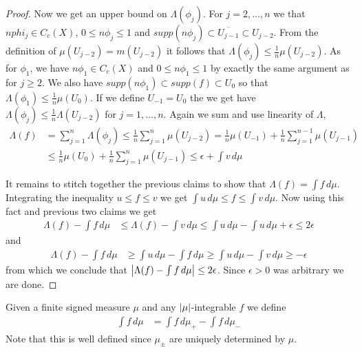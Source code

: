 \begin{proof}
Now we get an upper bound on $\Lambda(\phi_j)$.   For $j=2, \dotsc, n$ we that
$n phi_j \in C_c(X)$, $0 \leq n \phi_j \leq 1$ and $supp(n \phi_j)
\subset \overline{U_{j-1}} \subset U_{j-2}$.  From the definition of
$\mu(U_{j-2}) =m(U_{j-2})$ it follows that $\Lambda(\phi_j) \leq
\frac{1}{n} \mu(U_{j-2})$.  As for $\phi_1$, we have
$n \phi_1 \in C_c(X)$ and $0 \leq n\phi_1 \leq 1$ by exactly the same
argument as for $j \geq 2$.  We also have $supp(n \phi_1) \subset
supp(f) \subset U_0$ so that $\Lambda(\phi_1) \leq \frac{1}{n}
\mu(U_0)$.  If we define $U_{-1} = U_0$ the we get
have $\Lambda(\phi_j) \leq \frac{1}{n} \Lambda(U_{j-2})$ for $j=1,
\dotsc, n$.  Again we sum and use linearity of $\Lambda$,
\begin{align*}
\Lambda(f) &= \sum_{j=1}^n \Lambda(\phi_j) \leq \frac{1}{n}
\sum_{j=1}^n \mu(U_{j-2}) = \frac{1}{n} \mu(U_{-1}) +  \frac{1}{n}
\sum_{j=1}^{n-1} \mu(U_{j-1}) \\
&\leq \frac{1}{n} \mu(U_{0}) +  \frac{1}{n}
\sum_{j=1}^{n} \mu(U_{j-1}) \leq \epsilon + \int v \, d\mu
\end{align*}

It remains to stitch together the previous claims to
show that $\Lambda(f) = \int f \, d\mu$.  Integrating the inequality
$u \leq f \leq v$ we get $\int u \, d\mu \leq f \leq \int v \, d\mu$.
Now using this fact and previous two claims we get
\begin{align*}
\Lambda(f) - \int f \, d\mu &\leq \Lambda(f) - \int v \, d\mu \leq
\int u \, d\mu  - \int u \, d\mu + \epsilon \leq 2 \epsilon
\end{align*}
and
\begin{align*}
\Lambda(f) - \int f \, d\mu &\geq \int u \, d\mu - \int f \, d\mu \geq
\int u \, d\mu - \int v \, d\mu \geq -\epsilon
\end{align*}
from which we conclude that $\left \vert \Lambda(f) - \int f \, d\mu \right \vert \leq
2\epsilon$.  Since $\epsilon > 0$ was arbitrary we are done.
\end{proof}

Given a finite signed measure $\mu$ and any $\left \vert \mu \right \vert$-integrable $f$ we define
\begin{align*}
\int f \, d \mu &= \int f \, d \mu_+ - \int f \, d\mu_-
\end{align*}
Note that this is well defined since $\mu_\pm$ are uniquely determined by $\mu$.  

